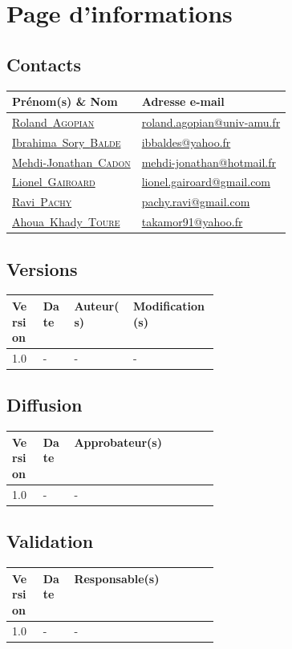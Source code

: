\documentclass[11pt,fleqn]{book} %
\makeatletter
\newcommand{\rolandemail}{\href{mailto:roland.agopian@univ-amu.fr}{roland.agopian@univ-amu.fr}\xspace}
\newcommand{\raviemail}{\href{mailto:pachy.ravi@gmail.com}{pachy.ravi@gmail.com}\xspace}
\newcommand{\mjemail}{\href{mailto:mehdi-jonathan@hotmail.fr}{mehdi-jonathan@hotmail.fr}\xspace}
\newcommand{\lionelemail}{\href{mailto:lionel.gairoard@gmail.com}{lionel.gairoard@gmail.com}\xspace}
\newcommand{\ibrahimaemail}{\href{mailto:ibbaldes@yahoo.fr}{ibbaldes@yahoo.fr}\xspace}
\newcommand{\khadyemail}{\href{mailto:takamor91@yahoo.fr}{takamor91@yahoo.fr}\xspace}
\newcommand{\roland}{\href{mailto:roland.agopian@univ-amu.fr}{Roland~\textsc{Agopian}}\xspace}
\newcommand{\ravi}{\href{mailto:pachy.ravi@gmail.com}{Ravi~\textsc{Pachy}}\xspace}
\newcommand{\mj}{\href{mailto:mehdi-jonathan@hotmail.fr}{Mehdi-Jonathan~\textsc{Cadon}}\xspace}
\newcommand{\lionel}{\href{mailto:lionel.gairoard@gmail.com}{Lionel~\textsc{Gairoard}}\xspace}
\newcommand{\ibrahima}{\href{mailto:ibbaldes@yahoo.fr}{Ibrahima~Sory~\textsc{Balde}}\xspace}
\newcommand{\khady}{\href{mailto:takamor91@yahoo.fr}{Ahoua~Khady~\textsc{Toure}}\xspace}
\makeatother
\begin{document}
\chapter*{Page d'informations}

\section*{Contacts}
\begin{tabularx}{\linewidth}{X X}
	\toprule
	Prénom(s) \& Nom & Adresse e-mail \\
	\midrule
	\roland & \rolandemail \\
	\hline
	\ibrahima & \ibrahimaemail \\
	\hline
	\mj & \mjemail \\
	\hline
	\lionel & \lionelemail \\
	\hline
	\ravi & \raviemail \\
	\hline
	\khady & \khadyemail \\
	\bottomrule
\end{tabularx}

\section*{Versions}
\begin{tabularx}{\linewidth}{m{0.15\linewidth} m{0.15\linewidth} X X}
	\toprule
	Version & Date & Auteur(s) & Modification(s) \\
	\midrule
	1.0 & - & - & - \\
	\bottomrule
\end{tabularx}

\section*{Diffusion}
\begin{tabularx}{\linewidth}{m{0.15\linewidth} m{0.15\linewidth} X}
	\toprule
	Version & Date & Approbateur(s) \\
	\midrule
	1.0 & - & - \\
	\bottomrule
\end{tabularx}

\section*{Validation}
\begin{tabularx}{\linewidth}{m{0.15\linewidth} m{0.15\linewidth} X}
	\toprule
	Version & Date & Responsable(s) \\
	\midrule
	1.0 & - & - \\
	\bottomrule
\end{tabularx}
\end{document}

